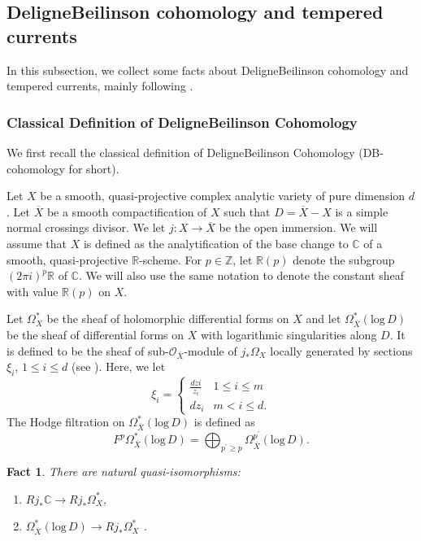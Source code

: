 \documentclass[11pt, a4paper]{amsart}
\theoremstyle{plain}
\newtheorem{fact}[theorem]{Fact}
\theoremstyle{definition}
\numberwithin{equation}{section}
\def\CC{\mathbb{C}}
\def\RR{\mathbb{R}}
\def\ZZ{\mathbb{Z}}
\begin{document}
\subsection{Deligne{\textendash}Beilinson cohomology and tempered currents}
 \label{SS: DB cohomology}
 In this subsection, we collect some facts about Deligne{\textendash}Beilinson cohomology and tempered currents, mainly following \cite{BCLRJ24}. 

\subsubsection{Classical Definition of Deligne{\textendash}Beilinson Cohomology}
We first recall the classical definition of Deligne{\textendash}Beilinson Cohomology (DB-cohomology for short). 

\par Let $X$ be a smooth, quasi-projective complex analytic variety of pure dimension $d$. Let $\overline{X}$ be a smooth compactification of $X$ such that $D = \overline{X} - X$ is a simple normal crossings divisor. We let $j \colon X \rightarrow \overline{X}$ be the open immersion. We will assume that $X$ is defined as the analytification of the base change to $\CC$ of a smooth, quasi-projective $\RR$-scheme. For $p \in \ZZ$, let $\RR(p)$ denote the subgroup  $(2\pi i)^{p} \RR$ of $\CC$. We will also use the same notation to denote the constant sheaf with value $\RR(p)$ on $X$. 

\par Let $\Omega^{*}_{X}$ be the sheaf of holomorphic differential forms on $X$ and let $\Omega_{\overline{X}}^{*}(\mathrm{log}\, D)$ be the sheaf of differential forms on $X$ with logarithmic singularities along $D$.  It is defined to be the sheaf of sub-$\mathcal{O}_{\overline{X}}$-module of $j_{*} \Omega_{X}$ locally generated by sections $\xi_{i}, \, 1 \le i \le d$ (see \cite[(3.1.2)]{HodgeII}). Here, we let 
\begin{equation*}
    \xi_{i} = \begin{cases}
                \frac{dz{i}}{z_{i}} &  1 \le i \le m \\
                dz_{i} & m < i \le d. 
               \end{cases}
\end{equation*}
The Hodge filtration  on $\Omega_{\overline{X}}^{*}(\mathrm{log}\, D)$ is defined as 
\begin{equation*}
    F^{p}\Omega_{\overline{X}}^{*}(\mathrm{log}\, D) = \bigoplus_{p^{\prime} \ge p}\Omega_{\overline{X}}^{p^{\prime}}(\mathrm{log}\, D). 
\end{equation*}
\begin{fact}
\label{Fact: Betti to log_de Rham}
    There are natural quasi-isomorphisms: 
    \begin{enumerate}
        \item  $Rj_{*} \CC \rightarrow Rj_{*} \Omega_{X}^{*}$,
        \item  $\Omega^{*}_{\overline{X}}(\mathrm{log}\, D) \rightarrow Rj_{*}\Omega_{X}^{*}$ \cite[(3.1.8.2)]{HodgeII}. 
    \end{enumerate}
\end{fact}
\end{document}
